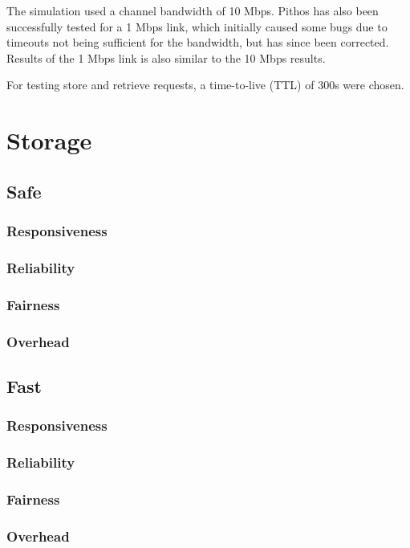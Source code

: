 The simulation used a channel bandwidth of 10 Mbps. Pithos has also been successfully tested for a 1 Mbps link, which initially caused some bugs due to timeouts not being sufficient for the bandwidth, but has since been corrected. Results of the 1 Mbps link is also similar to the 10 Mbps results.

For testing store and retrieve requests, a time-to-live (TTL) of 300s were chosen.

    \section{Storage}
            \subsection{Safe}
                \subsubsection{Responsiveness}
                \subsubsection{Reliability}
                        \label{reliability_compare_storage}
                \subsubsection{Fairness}
                \subsubsection{Overhead}
            \subsection{Fast}
                \subsubsection{Responsiveness}
                \subsubsection{Reliability}
                \subsubsection{Fairness}
                \subsubsection{Overhead}
